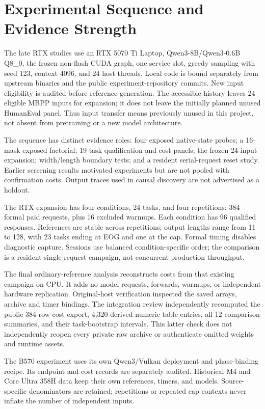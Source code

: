 \documentclass{article}
\begin{document}
\section{Experimental Sequence and Evidence Strength}
The late RTX studies use an RTX 5070 Ti Laptop, Qwen3-8B/Qwen3-0.6B Q8\_0, the frozen non-flash CUDA graph, one service slot, greedy sampling with seed 123, context 4096, and 24 host threads. Local code is bound separately from upstream binaries and the public experiment-repository commits. New input eligibility is audited before reference generation. The accessible history leaves 24 eligible MBPP inputs for expansion; it does not leave the initially planned unused HumanEval panel. Thus input transfer means previously unused in this project, not absent from pretraining or a new model architecture.

The sequence has distinct evidence roles: four exposed native-state probes; a 16-mask exposed factorial; 19-task qualification and cost panels; the frozen 24-input expansion; width/length boundary tests; and a resident serial-request reset study. Earlier screening results motivated experiments but are not pooled with confirmation costs. Output traces used in causal discovery are not advertised as a holdout.

The RTX expansion has four conditions, 24 tasks, and four repetitions: 384 formal paid requests, plus 16 excluded warmups. Each condition has 96 qualified responses. References are stable across repetitions; output lengths range from 11 to 128, with 23 tasks ending at EOG and one at the cap. Formal timing disables diagnostic capture. Sessions use balanced condition-specific order; the comparison is a resident single-request campaign, not concurrent production throughput.

The final ordinary-reference analysis reconstructs costs from that existing campaign on CPU. It adds no model requests, forwards, warmups, or independent hardware replication. Original-host verification inspected the saved arrays, archive and timer bindings. The integration review independently recomputed the public 384-row cost export, 4,320 derived numeric table entries, all 12 comparison summaries, and their task-bootstrap intervals. This latter check does not independently reopen every private raw archive or authenticate omitted weights and runtime assets.

The B570 experiment uses its own Qwen3/Vulkan deployment and phase-binding recipe. Its endpoint and cost records are separately audited. Historical M4 and Core Ultra 358H data keep their own references, timers, and models. Source-specific denominators are retained; repetitions or repeated cap contexts never inflate the number of independent inputs.
\end{document}
